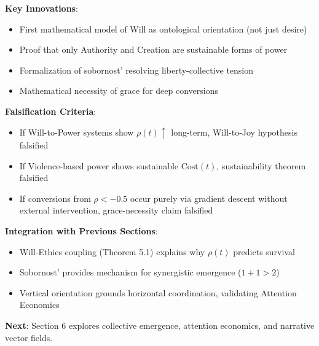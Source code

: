 \documentclass[11pt,a4paper]{article}
\theoremstyle{definition}
\theoremstyle{remark}
\begin{document}
\begin{enumerate}
\begin{mdframed}[backgroundcolor=green!10,linewidth=2pt,linecolor=green!70!black]
\textbf{Key Innovations}:
\begin{itemize}[nosep]
    \item First mathematical model of Will as ontological orientation (not just desire)
    \item Proof that only Authority and Creation are sustainable forms of power
    \item Formalization of sobornost' resolving liberty-collective tension
    \item Mathematical necessity of grace for deep conversions
\end{itemize}

\textbf{Falsification Criteria}:
\begin{itemize}[nosep]
    \item If Will-to-Power systems show \(\rho(t) \uparrow\) long-term, Will-to-Joy hypothesis falsified
    \item If Violence-based power shows sustainable \(\text{Cost}(t)\), sustainability theorem falsified
    \item If conversions from \(\rho < -0.5\) occur purely via gradient descent without external intervention, grace-necessity claim falsified
\end{itemize}

\textbf{Integration with Previous Sections}:
\begin{itemize}[nosep]
    \item Will-Ethics coupling (Theorem 5.1) explains why \(\rho(t)\) predicts survival
    \item Sobornost' provides mechanism for synergistic emergence (\(1+1>2\))
    \item Vertical orientation grounds horizontal coordination, validating Attention Economics
\end{itemize}

\textbf{Next}: Section 6 explores collective emergence, attention economics, and narrative vector fields.
\end{mdframed}

\begin{figure}[H]
\centering
{}
\end{figure}
\end{enumerate}
\end{document}
